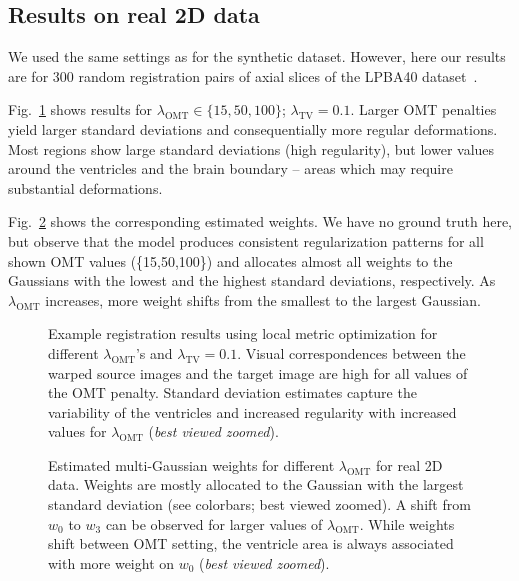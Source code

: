 \documentclass[10pt,twocolumn,letterpaper,table]{article}
\numberwithin{equation}{section}
\theoremstyle{plain}
\theoremstyle{definition}
\begin{document}
\subsection{Results on real 2D data}
\label{subsec:real_2d_experiment}

We used the same settings as for the synthetic dataset. However, here our results are for 300 random registration pairs of axial slices of the LPBA40 dataset~\cite{klein2009}. 

Fig.~\ref{fig:real_example_results_images} shows results for $\lambda_{\text{OMT}}\in\{15,50,100\}$; $\lambda_{\text{TV}}=0.1$. Larger OMT penalties yield larger standard deviations and consequentially more regular deformations. Most regions show large standard deviations (high regularity), but lower values around the ventricles and the brain boundary -- areas which may require substantial deformations. 

Fig.~\ref{fig:real_example_results_weights} shows the corresponding estimated weights. We have no ground truth here, but observe that the model produces consistent regularization patterns for all shown OMT values (\{15,50,100\}) and allocates almost all weights to the Gaussians with the lowest and the highest standard deviations, respectively. As $\lambda_{\text{OMT}}$ increases, more weight shifts from the smallest to the largest Gaussian.

\begin{figure}[t!]
\caption{Example registration results using local metric optimization for different $\lambda_{\text{OMT}}$'s and $\lambda_{\text{TV}}=0.1$. Visual correspondences between the warped source images and the target image are high for all values of the OMT penalty. Standard deviation estimates capture the variability of the ventricles and increased regularity with increased values for $\lambda_{\text{OMT}}$ (\emph{best viewed zoomed}).}
  \label{fig:real_example_results_images}
  \vspace{-0.3cm}
\end{figure}

\begin{figure}[t!]
  \caption{Estimated multi-Gaussian weights for different $\lambda_{\text{OMT}}$ for real 2D data. Weights are mostly allocated to the Gaussian with the largest standard deviation (see colorbars; best viewed zoomed). A shift from $w_0$ to $w_3$ can be observed for larger values of $\lambda_{\text{OMT}}$. While weights shift between OMT setting, the ventricle area is always associated with more weight on $w_0$ (\emph{best viewed zoomed}).} 
  \label{fig:real_example_results_weights}
  \vspace{-0.5cm}
\end{figure}
\end{document}
